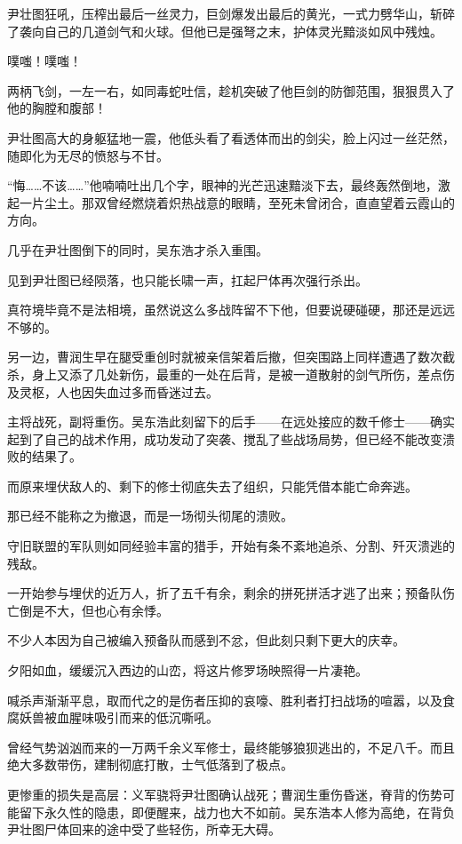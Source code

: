 尹壮图狂吼，压榨出最后一丝灵力，巨剑爆发出最后的黄光，一式力劈华山，斩碎了袭向自己的几道剑气和火球。但他已是强弩之末，护体灵光黯淡如风中残烛。

噗嗤！噗嗤！

两柄飞剑，一左一右，如同毒蛇吐信，趁机突破了他巨剑的防御范围，狠狠贯入了他的胸膛和腹部！

尹壮图高大的身躯猛地一震，他低头看了看透体而出的剑尖，脸上闪过一丝茫然，随即化为无尽的愤怒与不甘。

“悔……不该……”他喃喃吐出几个字，眼神的光芒迅速黯淡下去，最终轰然倒地，激起一片尘土。那双曾经燃烧着炽热战意的眼睛，至死未曾闭合，直直望着云霞山的方向。

几乎在尹壮图倒下的同时，吴东浩才杀入重围。

见到尹壮图已经陨落，也只能长啸一声，扛起尸体再次强行杀出。

真符境毕竟不是法相境，虽然说这么多战阵留不下他，但要说硬碰硬，那还是远远不够的。

另一边，曹润生早在腿受重创时就被亲信架着后撤，但突围路上同样遭遇了数次截杀，身上又添了几处新伤，最重的一处在后背，是被一道散射的剑气所伤，差点伤及灵枢，人也因失血过多而昏迷过去。

主将战死，副将重伤。吴东浩此刻留下的后手——在远处接应的数千修士——确实起到了自己的战术作用，成功发动了突袭、搅乱了些战场局势，但已经不能改变溃败的结果了。

而原来埋伏敌人的、剩下的修士彻底失去了组织，只能凭借本能亡命奔逃。

那已经不能称之为撤退，而是一场彻头彻尾的溃败。

守旧联盟的军队则如同经验丰富的猎手，开始有条不紊地追杀、分割、歼灭溃逃的残敌。

一开始参与埋伏的近万人，折了五千有余，剩余的拼死拼活才逃了出来；预备队伤亡倒是不大，但也心有余悸。

不少人本因为自己被编入预备队而感到不忿，但此刻只剩下更大的庆幸。

夕阳如血，缓缓沉入西边的山峦，将这片修罗场映照得一片凄艳。

喊杀声渐渐平息，取而代之的是伤者压抑的哀嚎、胜利者打扫战场的喧嚣，以及食腐妖兽被血腥味吸引而来的低沉嘶吼。

曾经气势汹汹而来的一万两千余义军修士，最终能够狼狈逃出的，不足八千。而且绝大多数带伤，建制彻底打散，士气低落到了极点。

更惨重的损失是高层：义军骁将尹壮图确认战死；曹润生重伤昏迷，脊背的伤势可能留下永久性的隐患，即便醒来，战力也大不如前。吴东浩本人修为高绝，在背负尹壮图尸体回来的途中受了些轻伤，所幸无大碍。

